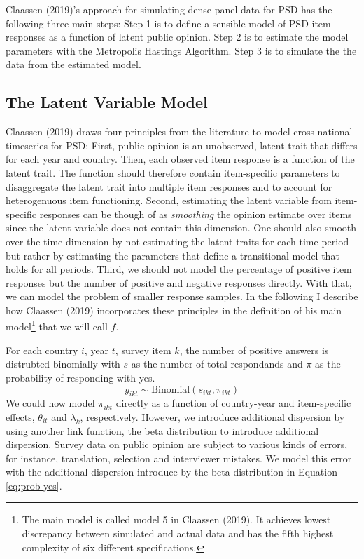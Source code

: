 \documentclass[12pt,english,a4paper,oneside]{article}
\theoremstyle{definition}
\theoremstyle{definition}
\theoremstyle{definition}
\theoremstyle{definition}
\theoremstyle{remark}
\begin{document}
Claassen (2019)'s approach for simulating dense panel data for PSD has the following three main steps: Step 1 is to define a sensible model of PSD item responses as a function of latent public opinion. Step 2 is to estimate the model parameters with the Metropolis Hastings Algorithm. Step 3 is to simulate the the data from the estimated model.

\hypertarget{the-latent-variable-model}{%
\subsection{The Latent Variable Model}\label{the-latent-variable-model}}

Claassen (2019) draws four principles from the literature to model cross-national timeseries for PSD: First, public opinion is an unobserved, latent trait that differs for each year and country. Then, each observed item response is a function of the latent trait. The function should therefore contain item-specific parameters to disaggregate the latent trait into multiple item responses and to account for heterogenuous item functioning. Second, estimating the latent variable from item-specific responses can be though of as \emph{smoothing} the opinion estimate over items since the latent variable does not contain this dimension. One should also smooth over the time dimension by not estimating the latent traits for each time period but rather by estimating the parameters that define a transitional model that holds for all periods. Third, we should not model the percentage of positive item responses but the number of positive and negative responses directly. With that, we can model the problem of smaller response samples. In the following I describe how Claassen (2019) incorporates these principles in the definition of his main model\footnote{The main model is called model 5 in Claassen (2019). It achieves lowest discrepancy between simulated and actual data and has the fifth highest complexity of six different specifications.} that we will call \(f\).\newline

\noindent
For each country \(i\), year \(t\), survey item \(k\), the number of positive answers is distrubted binomially with \(s\) as the number of total respondands and \(\pi\) as the probability of responding with yes.
\begin{equation}
\label{eq:num-resp}
y_{ikt} \sim \text{Binomial}(s_{ikt}, \pi_{ikt})
\end{equation}
We could now model \(\pi_{ikt}\) directly as a function of country-year and item-specific effects, \(\theta_{it}\) and \(\lambda_k\), respectively. However, we introduce additional dispersion by using another link function, the beta distribution to introduce additional dispersion. Survey data on public opinion are subject to various kinds of errors, for instance, translation, selection and interviewer mistakes. We model this error with the additional dispersion introduce by the beta distribution in Equation \eqref{eq:prob-yes}.
\end{document}
